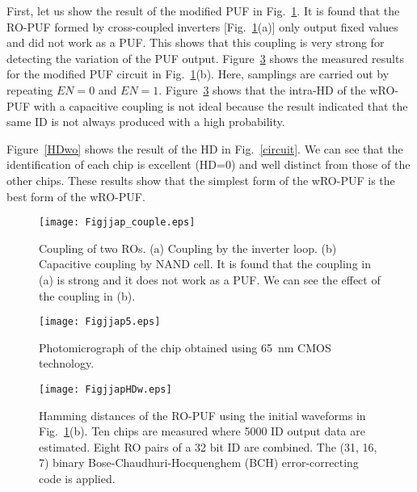 \documentclass[%
reprint, amsmath,amssymb,%
pra,
]{revtex4-1}
\begin{document}
First, let us show the result of the modified PUF in Fig.~\ref{couple}.  
It is found that the RO-PUF formed by cross-coupled inverters [Fig.~\ref{couple}(a)] only output 
fixed values and did not work as a PUF. This shows that this coupling is very strong for detecting the variation of the PUF output. 
Figure~\ref{HDw} shows the measured results for the modified PUF circuit in Fig.~\ref{couple}(b). 
Here, samplings are carried out by repeating $EN=0$ and $EN=1$.  
Figure~\ref{HDw} shows that the intra-HD of the wRO-PUF with a capacitive coupling is not ideal because 
the result indicated that the same ID is not always produced with a high probability. 

Figure~\ref{HDwo} shows the result of the HD in Fig.~\ref{circuit}.  
We can see that the identification of each chip is excellent (HD=0) 
and well distinct from those of the other chips. 
These results show that the simplest form of the wRO-PUF is the best form of the wRO-PUF.



\begin{figure}
\begin{center}
\texttt{[image: Figjjap\_couple.eps]}
\end{center}
\caption{Coupling of two ROs. (a) Coupling by the inverter loop. (b) 
Capacitive coupling by NAND cell. It is found that the coupling in (a) is strong and it does not work as a PUF. 
We can see the effect of the coupling in (b). }
\label{couple}
\end{figure}

\begin{figure}
\begin{center}
\texttt{[image: Figjjap5.eps]}
\end{center}
\caption{Photomicrograph of the chip obtained using 65~nm CMOS technology.}
\label{chip}
\end{figure}
\begin{figure}
\begin{center}
\texttt{[image: FigjjapHDw.eps]}
\end{center}
\caption{Hamming distances of the RO-PUF using the initial waveforms in Fig.~\ref{couple}(b). 
 Ten chips are measured where 5000 ID output data are estimated.
Eight RO pairs of a 32 bit ID are combined. 
The (31, 16, 7) binary Bose-Chaudhuri-Hocquenghem (BCH) error-correcting code is applied.}
\label{HDw}
\end{figure}
\end{document}
